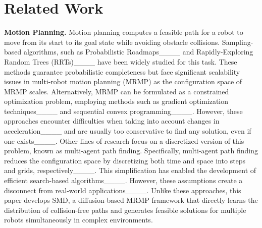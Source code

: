 \section{Related Work}
\textbf{Motion Planning.}
Motion planning computes a feasible path for a robot to move from its start to its goal state while avoiding obstacle collisions.
Sampling-based algorithms, such as Probabilistic Roadmaps____ and Rapidly-Exploring Random Trees (RRTs)____ have been widely studied for this task. These methods guarantee probabilistic completeness but face significant scalability issues in multi-robot motion planning (MRMP) as the configuration space of MRMP scales. 
Alternatively, MRMP can be formulated as a constrained optimization problem, employing methods such as gradient optimization techniques____ and sequential convex programming____. However, these approaches encounter difficulties when taking into account changes in acceleration____ and are usually too conservative to find any solution, even if one exists____. 
Other lines of research focus on a discretized version of this problem, known as multi-agent path finding. Specifically, multi-agent path finding reduces the configuration space by discretizing both time and space into steps and grids, respectively____. This simplification has enabled the development of efficient search-based algorithms____. However, these assumptions create a disconnect from real-world applications____. Unlike these approaches, this paper develops SMD, a diffusion-based MRMP framework that directly learns the distribution of collision-free paths and generates feasible solutions for multiple robots simultaneously in complex environments.

